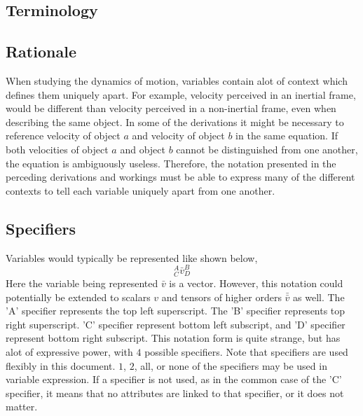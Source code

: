 \documentclass[class=report, 12pt, crop=false]{standalone}
\begin{document}
\begin{center}
\chapter{Terminology}
\begin{comment}
\end{comment}
\section{Rationale}
\begin{comment}
\end{comment}
When studying the dynamics of motion, variables contain alot of context which defines them uniquely apart. For example, velocity perceived in an inertial frame, would be different than velocity perceived in a non-inertial frame, even when describing the same object. In some of the derivations it might be necessary to reference velocity of object $a$ and velocity of object $b$ in the same equation. If both velocities of object $a$ and object $b$ cannot be distinguished from one another, the equation is ambiguously useless. Therefore, the notation presented in the perceding derivations and workings must be able to express many of the different contexts to tell each variable uniquely apart from one another.
\section{Specifiers}
\begin{comment}
\end{comment}
Variables would typically be represented like shown below,
$${}^{A}_{C}\bar{v}^{B}_{D}$$
Here the variable being represented $\bar{v}$ is a vector. However, this notation could potentially be extended to scalars $v$ and tensors of higher orders $\bar{\bar{v}}$ as well. The 'A' specifier represents the top left superscript. The 'B' specifier represents top right superscript. 'C' specifier represent bottom left subscript, and 'D' specifier represent bottom right subscript. This notation form is quite strange, but has alot of expressive power, with $4$ possible specifiers. Note that specifiers are used flexibly in this document. $1$, $2$, all, or none of the specifiers may be used in variable expression. If a specifier is not used, as in the common case of the 'C' specifier, it means that no attributes are linked to that specifier, or it does not matter. 

\end{center}
\end{document}
